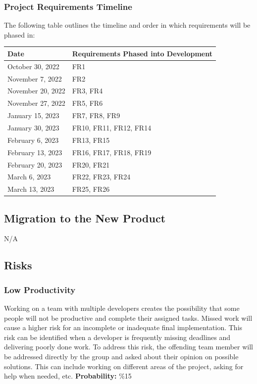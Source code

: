 \documentclass[12pt]{article}
\begin{document}
\subsubsection {Project Requirements Timeline}

The following table outlines the timeline and order in which requirements will be phased in:\\

\begin{tabularx}{\textwidth}{p{4cm}X}
	\toprule {\bf Date} & {\bf Requirements Phased into Development} \\
	\midrule
	October 30, 2022 & FR1\\
	November 7, 2022 & FR2 \\
	November 20, 2022 & FR3, FR4 \\
	November 27, 2022 & FR5, FR6 \\
	January 15, 2023 & FR7, FR8, FR9 \\
	January 30, 2023 & FR10, FR11, FR12, FR14\\
	February 6, 2023 & FR13, FR15 \\
	February 13, 2023 & FR16, FR17, FR18, FR19\\
	February 20, 2023 & FR20, FR21\\
	March 6, 2023 & FR22, FR23, FR24 \\
	March 13, 2023 & FR25, FR26\\
	\bottomrule
\end{tabularx}

\subsection{Migration to the New Product}
N/A

\subsection{Risks}
\subsubsection{Low Productivity}
Working on a team with multiple developers creates the possibility that some people will not be productive and complete their assigned tasks. Missed work will cause a higher risk for an incomplete or inadequate final implementation. This risk can be identified when a developer is frequently missing deadlines and delivering poorly done work. To address this risk, the offending team member will be addressed directly by the group and asked about their opinion on possible solutions. This can include working on different areas of the project, asking for help when needed, etc.\newline
\textbf{Probability:} \%15
\end{document}
